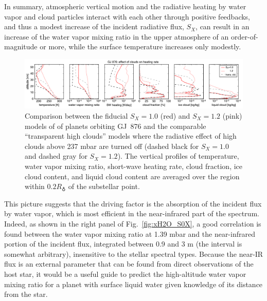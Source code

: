 \documentclass[11pt,numberedappendix,twocolappendix,]{emulateapj}
\def\water{H$_2$O}
\def\preslevel{1.39 mbar}
\def\wv{water vapor}
\newcommand{\yf}[1]{{\color{orange}#1}}
\begin{document}
In summary, atmospheric vertical motion and the radiative heating by water vapor and cloud particles interact with each other through positive feedbacks, and thus a modest increase of the incident radiative flux, $S_X$, can result in  an increase of the \wv{} mixing ratio in the upper atmosphere of an order-of-magnitude \yf{or more}, while the surface temperature increases only modestly. 


\begin{figure}[htb]
    \begin{center}
    \includegraphics[width=1\hsize]{GJ876_heat_cld.pdf}
    \end{center}
\caption{Comparison between the fiducial $S_X=1.0$ (red) and $S_X=1.2$ (pink) models of of planets orbiting GJ~876 and the comparable ``transparent high clouds'' models where the radiative effect of high clouds above 237 mbar are turned off (dashed black for $S_X=1.0$ and dashed gray for $S_X=1.2$). The vertical profiles of temperature, \wv{} mixing ratio, short-wave heating rate, cloud fraction, ice cloud content, and liquid cloud content are averaged over the region within $0.2R_\earth $ of the substellar point. }
\label{fig:GJ876_heat_cld}
\end{figure}

This picture suggests that the driving factor is the absorption of the incident flux by water vapor, which is most efficient in the near-infrared part of the spectrum. 
Indeed, as shown in the right panel of Fig.~\ref{fig:xH2O_S0X}, a good correlation is found between the \wv{} mixing ratio at \preslevel{} and the near-infrared portion of the incident flux, integrated between 0.9 and 3 \textmu m (the interval is somewhat arbitrary), insensitive to the stellar spectral types. 
Because the near-IR flux is an external parameter that can be found from direct observations of the host star, it would be a useful guide to predict the high-altitude \wv{}  mixing ratio for a planet with surface liquid water \yf{given knowledge of its distance from the star}. 
\end{document}
